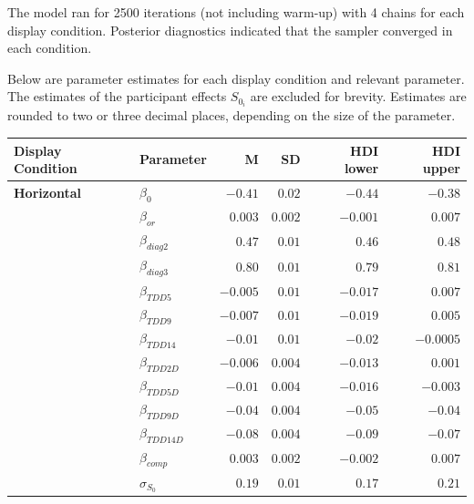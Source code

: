 The model ran for 2500 iterations (not including warm-up) with 4 chains for each display condition. Posterior diagnostics indicated that the sampler converged in each condition.

Below are parameter estimates for each display condition and relevant parameter. The estimates of the participant effects $S_{0_i}$ are excluded for brevity. Estimates are rounded to two or three decimal places, depending on the size of the parameter.
    
\begin{table}[ht]
    \centering
    \begin{tabular}{llrrrr}
        \toprule
        Display Condition & Parameter & \textnormal{M} & \textnormal{SD} & HDI lower & HDI upper \\
        \midrule
        \textbf{Horizontal}  &  $\beta_{0}$     &    $-0.41$   &   $0.02$    &  $-0.44$     & $-0.38$     \\
                    &  $\beta_{or}$    &    $0.003$   &   $0.002$   &  $-0.001$    & $0.007$     \\
                    &  $\beta_{diag2}$ &    $0.47$    &   $0.01$    &  $0.46$      & $0.48$      \\
                    &  $\beta_{diag3}$ &    $0.80$    &   $0.01$    &  $0.79$      & $0.81$      \\
                    &  $\beta_{TDD5}$  &    $-0.005$  &   $0.01$    &  $-0.017$    & $0.007$     \\
                    &  $\beta_{TDD9}$  &    $-0.007$  &   $0.01$    &  $-0.019$    & $0.005$     \\
                    &  $\beta_{TDD14}$ &    $-0.01$   &   $0.01$    &  $-0.02$     & $-0.0005$   \\
                    &  $\beta_{TDD2D}$ &    $-0.006$  &   $0.004$   &  $-0.013$    & $0.001$     \\
                    &  $\beta_{TDD5D}$ &    $-0.01$   &   $0.004$   &  $-0.016$    & $-0.003$    \\
                    &  $\beta_{TDD9D}$ &    $-0.04$   &   $0.004$   &  $-0.05$     & $-0.04$     \\
                    &  $\beta_{TDD14D}$&    $-0.08$   &   $0.004$   &  $-0.09$     & $-0.07$     \\
                    &  $\beta_{comp}$  &    $0.003$   &   $0.002$   &  $-0.002$    & $0.007$     \\
                    &  $\sigma_{S_0}$  &    $0.19$    &   $0.01$    &  $0.17$      & $0.21$      \\

\end{tabular}
\end{table}
